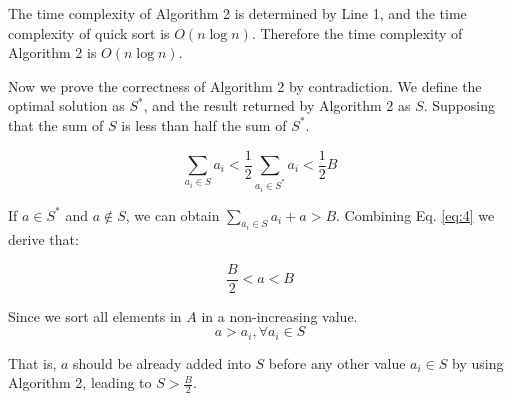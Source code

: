 \begin{problem}
\begin{enumerate}
  The time complexity of Algorithm 2 is determined by Line 1, and the time complexity of quick sort is $O(n\log n)$. Therefore the time complexity of Algorithm 2 is $O(n\log n)$. 
  
  Now we prove the correctness of Algorithm 2 by contradiction. We define the optimal solution as $S^*$, and the result returned by Algorithm 2 as $S$. Supposing that the sum of $S$ is less than half the sum of $S^*$.

  \begin{equation}\label{eq:4}
    \sum_{a_i\in S}{a_i}<\frac{1}{2}\sum_{a_i\in S^*}a_i<\frac{1}{2}B
  \end{equation}
  
  If $a\in S^*$ and $a \notin S$, we can obtain $\sum_{a_i\in S}{a_i}+a>B$. Combining Eq. \eqref{eq:4} we derive that:
  
  \begin{equation}
  \frac{B}{2}<a<B
  \end{equation}
  
  Since we sort all elements in $A$ in a non-increasing value.
  \begin{equation}
  a>a_i, \forall a_i\in{S}
  \end{equation}
  
  That is, $a$ should be already added into $S$ before any other value $a_i\in S$ by using Algorithm 2, leading to $S>\frac{B}{2}$.
  
  \end{enumerate}
  \end{problem}
  
